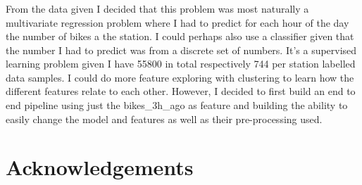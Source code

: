 \documentclass[a4paper]{article}
\begin{document}
    \subsubsection*{}
    From the data given I decided that this problem was most naturally a multivariate regression problem where I had to
    predict for each hour of the day the number of bikes a the station. I could perhaps also use a classifier given that
    the number I had to predict was from a discrete set of numbers. It's a supervised learning problem given I have 55800
    in total respectively 744 per station labelled data samples. I could do more feature exploring with clustering to
    learn how the different features relate to each other. However, I decided to first build an end to end pipeline using
    just the bikes\_3h\_ago as feature and building the ability to easily change the model and features as well as their
    pre-processing used.

    \section*{Acknowledgements}

    
    
\end{document}
